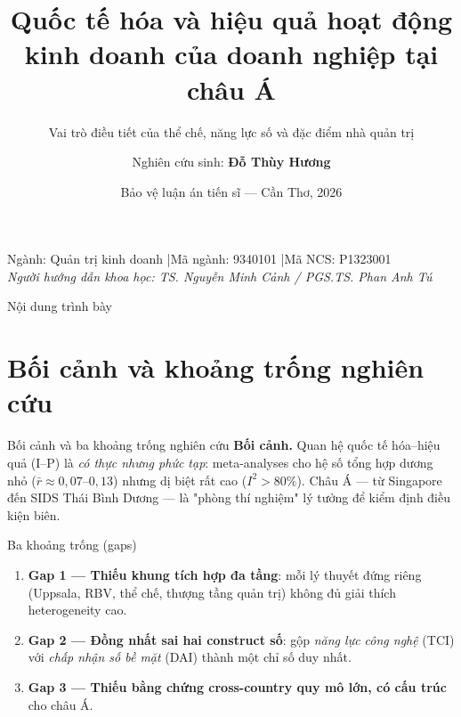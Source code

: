\documentclass[aspectratio=169,11pt]{beamer}
\title[Quốc tế hóa \& hiệu quả DN tại châu Á]{Quốc tế hóa và hiệu quả hoạt động kinh doanh của doanh nghiệp tại châu Á}
\subtitle{Vai trò điều tiết của thể chế, năng lực số và đặc điểm nhà quản trị}
\author[Đỗ Thùy Hương]{Nghiên cứu sinh: \textbf{Đỗ Thùy Hương}}
\institute[ĐH Cần Thơ]{Trường Kinh tế --- Trường Đại học Cần Thơ}
\date{Bảo vệ luận án tiến sĩ --- Cần Thơ, 2026}
\newcommand{\kw}[1]{\textcolor{accent}{\textbf{#1}}}
\begin{document}
\begin{frame}[plain]
  \titlepage
  \begin{center}\small
  Ngành: Quản trị kinh doanh \quad|\quad Mã ngành: 9340101 \quad|\quad Mã NCS: P1323001\\[2pt]
  \textit{Người hướng dẫn khoa học: TS. Nguyễn Minh Cảnh / PGS.TS. Phan Anh Tú}
  \end{center}
\end{frame}

\begin{frame}{Nội dung trình bày}
  \tableofcontents
\end{frame}

\section{Bối cảnh và khoảng trống nghiên cứu}
\begin{frame}{Bối cảnh và ba khoảng trống nghiên cứu}
  \textbf{Bối cảnh.} Quan hệ quốc tế hóa--hiệu quả (I--P) là \emph{có thực nhưng phức tạp}: meta-analyses cho hệ số tổng hợp dương nhỏ ($\bar r \approx 0{,}07$--$0{,}13$) nhưng dị biệt rất cao ($I^2 > 80\%$). Châu Á --- từ Singapore đến SIDS Thái Bình Dương --- là "phòng thí nghiệm" lý tưởng để kiểm định điều kiện biên.
  \vspace{0.4em}
  \begin{block}{Ba khoảng trống (gaps)}
  \begin{enumerate}
    \item \kw{Gap 1 --- Thiếu khung tích hợp đa tầng}: mỗi lý thuyết đứng riêng (Uppsala, RBV, thể chế, thượng tầng quản trị) không đủ giải thích heterogeneity cao.
    \item \kw{Gap 2 --- Đồng nhất sai hai construct số}: gộp \emph{năng lực công nghệ} (TCI) với \emph{chấp nhận số bề mặt} (DAI) thành một chỉ số duy nhất.
    \item \kw{Gap 3 --- Thiếu bằng chứng cross-country quy mô lớn, có cấu trúc} cho châu Á.
  \end{enumerate}
  \end{block}
\end{frame}

\end{document}
